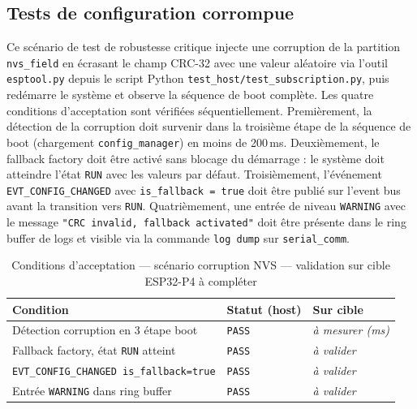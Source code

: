\subsection{Tests de configuration corrompue}
\label{subsec:t_corrupt}

Ce scénario de test de robustesse critique injecte une corruption
de la partition \texttt{nvs\_field} en écrasant le champ CRC-32
avec une valeur aléatoire via l'outil \texttt{esptool.py} depuis
le script Python \texttt{test\_host/test\_subscription.py}, puis
redémarre le système et observe la séquence de boot complète. Les
quatre conditions d'acceptation sont vérifiées séquentiellement.
Premièrement, la détection de la corruption doit survenir dans
la troisième étape de la séquence de boot (chargement
\texttt{config\_manager}) en moins de 200\,ms. Deuxièmement,
le fallback factory doit être activé sans blocage du démarrage :
le système doit atteindre l'état \texttt{RUN} avec les valeurs
par défaut. Troisièmement, l'événement \texttt{EVT\_CONFIG\_CHANGED}
avec \texttt{is\_fallback = true} doit être publié sur l'event bus
avant la transition vers \texttt{RUN}. Quatrièmement, une entrée
de niveau \texttt{WARNING} avec le message
\texttt{"CRC invalid, fallback activated"} doit être présente dans
le ring buffer de logs et visible via la commande
\texttt{log dump} sur \texttt{serial\_comm}.

\begin{table}[H]
\centering
\renewcommand{\arraystretch}{1.5}
\caption{Conditions d'acceptation — scénario corruption NVS — validation sur cible ESP32-P4 à compléter}
\label{tab:res_corrupt}
\small
\begin{tabular}{|p{6.5cm}|p{2.0cm}|p{2.8cm}|}
\hline
\rowcolor{gray!20}
\textbf{Condition} & \textbf{Statut (host)} & \textbf{Sur cible} \\
\hline
Détection corruption en 3\ieme{} étape boot  & \texttt{PASS} & \textit{à mesurer (ms)} \\
\hline
Fallback factory, état \texttt{RUN} atteint  & \texttt{PASS} & \textit{à valider} \\
\hline
\texttt{EVT\_CONFIG\_CHANGED is\_fallback=true} & \texttt{PASS} & \textit{à valider} \\
\hline
Entrée \texttt{WARNING} dans ring buffer     & \texttt{PASS} & \textit{à valider} \\
\hline
\end{tabular}
\end{table}


